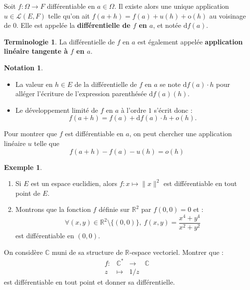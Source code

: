 \documentclass[french]{article}
\newcommand{\R}{\mathbb{R}}
\newcommand{\C}{\mathbb{C}}
\newcommand{\st}{^*}
\renewcommand{\o}{\text{o}}
\renewcommand{\d}{\text{d}}
\theoremstyle{plain}
\theoremstyle{definition}
\newtheorem*{ex}{Exemple}
\newtheorem*{notation}{Notation}
\newtheorem*{terminologie}{Terminologie}
\theoremstyle{remark}
\begin{document}
\begin{thm}%
	Soit $f:\Omega\to F$ différentiable en $a\in\Omega$. Il existe alors une unique application $u\in\mathcal{L}(E,F)$ telle qu'on ait $f(a+h)=f(a)+u(h)+\o(h)$ au voisinage de $0$. Elle est appelée la \textbf{différentielle de $f$ en $a$}, et notée $\d f(a)$.
\end{thm}

\begin{terminologie}
	La différentielle de $f$ en $a$ est également appelée \textbf{application linéaire tangente à $f$ en $a$}.
\end{terminologie}

\begin{notation}
	\begin{itemize}
		\item La valeur en $h\in E$ de la différentielle de $f$ en $a$ se note $\d f(a)\cdot h$ pour alléger l'écriture de l'expression parenthésée $\d f(a)(h)$.
		\item Le développement limité de $f$ en $a$ à l'ordre $1$ s'écrit donc :
		$$f(a+h)=f(a)+\d f(a)\cdot h+o(h).$$
	\end{itemize}
\end{notation}

\begin{met}
	Pour montrer que $f$ est différentiable en $a$, on peut chercher une application linéaire $u$ telle que $$f(a+h)-f(a)-u(h)=o(h)$$
\end{met}

\begin{ex}
	\begin{enumerate}
		\item Si $E$ est un espace euclidien, alors $f:x\mapsto\lVert x\rVert^2$ est différentiable en tout point de $E$.
		\item Montrons que la fonction $f$ définie sur $\R^2$ par $f(0,0)=0$ et : $$\forall (x,y)\in\R^2\setminus\{(0,0)\},\ f(x,y)=\frac{x^4+y^4}{x^2+y^2}$$ est différentiable en $(0,0)$.
	\end{enumerate}
\end{ex}

\begin{exo}
	On considère $\C$ muni de sa structure de $\R$-espace vectoriel. Montrer que : $$\begin{array}{lrcl}
		f:&\C\st&\longrightarrow&\C\\
		z&\longmapsto&1/z
	\end{array}$$ est différentiable en tout point et donner sa différentielle.
\end{exo}
\end{document}
